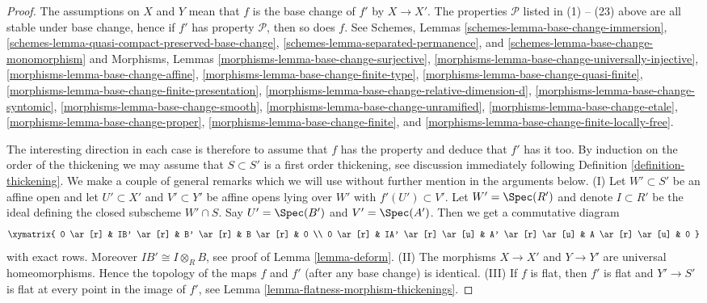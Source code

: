 \begin{proof}
The assumptions on $X$ and $Y$ mean that $f$ is the base change of
$f'$ by $X \to X'$.
The properties $\mathcal{P}$ listed in (1) -- (23) above are all stable
under base change, hence if $f'$ has property $\mathcal{P}$, then so
does $f$. See
Schemes, Lemmas \ref{schemes-lemma-base-change-immersion},
\ref{schemes-lemma-quasi-compact-preserved-base-change},
\ref{schemes-lemma-separated-permanence}, and
\ref{schemes-lemma-base-change-monomorphism}
and
Morphisms, Lemmas
\ref{morphisms-lemma-base-change-surjective},
\ref{morphisms-lemma-base-change-universally-injective},
\ref{morphisms-lemma-base-change-affine},
\ref{morphisms-lemma-base-change-finite-type},
\ref{morphisms-lemma-base-change-quasi-finite},
\ref{morphisms-lemma-base-change-finite-presentation},
\ref{morphisms-lemma-base-change-relative-dimension-d},
\ref{morphisms-lemma-base-change-syntomic},
\ref{morphisms-lemma-base-change-smooth},
\ref{morphisms-lemma-base-change-unramified},
\ref{morphisms-lemma-base-change-etale},
\ref{morphisms-lemma-base-change-proper},
\ref{morphisms-lemma-base-change-finite}, and
\ref{morphisms-lemma-base-change-finite-locally-free}.

\medskip\noindent
The interesting direction in each case is therefore to assume
that $f$ has the property and deduce that $f'$ has it too.
By induction on the order of the thickening we may
assume that $S \subset S'$ is a first order thickening, see
discussion immediately following
Definition \ref{definition-thickening}.
We make a couple of general remarks which we will use without further
mention in the arguments below.
(I) Let $W' \subset S'$ be an affine open and let $U' \subset X'$
and $V' \subset Y'$ be affine opens lying over $W'$ with $f'(U') \subset V'$.
Let $W' = \Spec(R')$ and denote $I \subset R'$ be the ideal
defining the closed subscheme $W' \cap S$. Say $U' = \Spec(B')$
and $V' = \Spec(A')$. Then we get a commutative diagram
$$
\xymatrix{
0 \ar[r] &
IB' \ar[r] &
B' \ar[r] &
B \ar[r] & 0 \\
0 \ar[r] &
IA' \ar[r] \ar[u] &
A' \ar[r] \ar[u] &
A \ar[r] \ar[u] & 0
}
$$
with exact rows. Moreover $IB' \cong I \otimes_R B$, see proof of
Lemma \ref{lemma-deform}.
(II) The morphisms $X \to X'$ and $Y \to Y'$ are universal homeomorphisms.
Hence the topology of the maps $f$ and $f'$ (after any base change)
is identical. (III) If $f$ is flat, then $f'$ is flat and
$Y' \to S'$ is flat at every point in the image of $f'$, see
Lemma \ref{lemma-flatness-morphism-thickenings}.


\end{proof}
